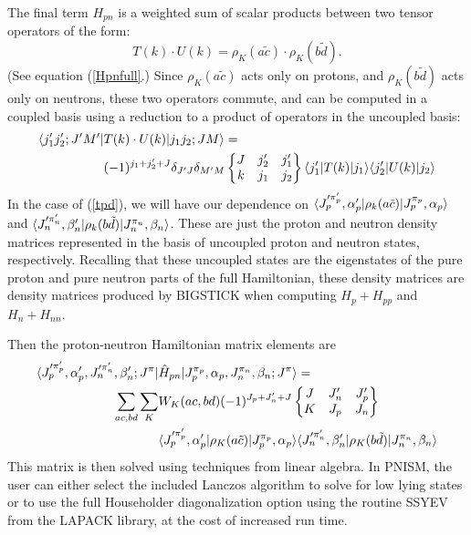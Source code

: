 The final term $H_{pn}$ is a weighted sum of scalar products between two 
tensor operators of the form:
\begin{equation}\label{tpd}
    T(k)\cdot U(k) = \rho_{K}(a\tilde{c}) \cdot \rho_{K} (b\tilde{d}).
\end{equation}
(See equation (\ref{Hpnfull}.) Since $\rho_K(a\tilde{c})$ acts only on protons,
and $\rho_K(b\tilde{d})$ acts only on neutrons, these two operators
commute, and can be computed in a coupled basis using a reduction to a product of 
operators in the uncoupled basis\cite{Edmonds}:
\begin{equation}\begin{split}
    \langle j_1'j_2';J'M'|&T(k)\cdot U(k)|j_1j_2;JM\rangle = \\
        &(-1)^{j_1+j_2'+J}\delta_{J'J}\delta_{M'M}
\begin{Bmatrix} 
J & j_2' & j_1' \\ 
k & j_1 & j_2 
\end{Bmatrix}   \langle j_1'|T(k)|j_1\rangle\langle j_2'|U(k)|j_2\rangle
\end{split}\end{equation}
In the case of (\ref{tpd}), we will have our dependence on 
$\langle J_p'^{\pi_p'},\alpha_p'|\rho_k(a\tilde{c})|J_p^{\pi_p},\alpha_p\rangle$ and
$\langle J_n'^{\pi_n'},\beta_n'|\rho_k(b\tilde{d})|J_n^{\pi_n},\beta_n\rangle$.
These are just the proton and neutron density matrices represented in the basis 
of uncoupled proton and neutron states, respectively. Recalling that these 
uncoupled states are the eigenstates of the pure proton and pure neutron 
parts of the full Hamiltonian, these density matrices are 
density matrices produced by BIGSTICK when computing
$H_p + H_{pp}$ and $H_n + H_{nn}$.

Then the proton-neutron Hamiltonian matrix elements are
\begin{equation}\begin{split}\label{eqn: hmat}
\langle J_p'^{\pi_p'},\alpha_p',J_n'^{\pi_n'},\beta_n';J^{\pi}|
 &\hat{H}_{pn} 
 |J_p^{\pi_p},\alpha_p,J_n^{\pi_n},\beta_n;J^{\pi}\rangle = \\
\sum_{ac,bd}\sum_{K}& W_K(ac,bd)(-1)^{J_p+J_n'+J}\begin{Bmatrix} J & J_n' & J_p' \\ K & J_p & J_n \end{Bmatrix} \\
&\langle J_p'^{\pi_p'},\alpha_p'|\rho_K(a\tilde{c})|J_p^{\pi_p},\alpha_p\rangle
\langle J_n'^{\pi_n'},\beta_n'|\rho_K(b\tilde{d})|J_n^{\pi_n},\beta_n\rangle
\end{split}\end{equation}
This matrix is then solved using techniques from linear algebra. In PNISM, the 
user can either select the included Lanczos algorithm to solve for low lying 
states or to use the full Householder diagonalization option using
the routine SSYEV from the LAPACK\cite{LAPACK} library, at the cost of increased run time.

